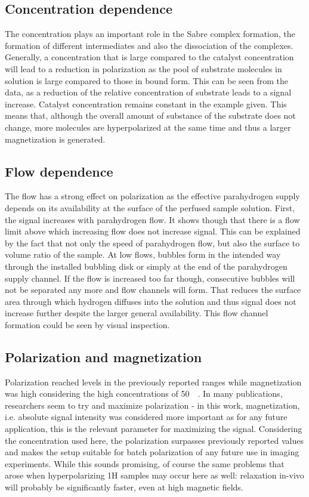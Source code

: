         \subsection{Concentration dependence}
            The concentration plays an important role in the Sabre complex formation, the formation of different intermediates and also the dissociation of the complexes. Generally, a concentration that is large compared to the catalyst concentration will lead to a reduction in polarization as the pool of substrate molecules in solution is large compared to those in bound form. This can be seen from the data, as a reduction of the relative concentration of substrate leads to a signal increase. Catalyst concentration remains constant in the example given. This means that, although the overall amount of substance of the substrate does not change, more molecules are hyperpolarized at the same time and thus a larger magnetization is generated.
        \subsection{Flow dependence}
            The flow has a strong effect on polarization as the effective parahydrogen supply depends on its availability at the surface of the perfused sample solution. First, the signal increases with parahydrogen flow. It shows though that there is a flow limit above which increasing flow does not increase signal. This can be explained by the fact that not only the speed of parahydrogen flow, but also the surface to volume ratio of the sample. At low flows, bubbles form in the intended way through the installed bubbling disk or simply at the end of the parahydrogen supply channel. If the flow is increased too far though, consecutive bubbles will not be separated any more and flow channels will form. That reduces the surface area through which hydrogen diffuses into the solution and thus signal does not increase further despite the larger general availability. This flow channel formation could be seen by visual inspection.
        \subsection{Polarization and magnetization}
            Polarization reached levels in the previously reported ranges while magnetization was high considering the high concentrations of \SI{50}{\milli\molar}. In many publications, researchers seem to try and maximize polarization - in this work, magnetization, i.e. absolute signal intensity was considered more important as for any future application, this is the relevant parameter for maximizing the signal. Considering the concentration used here, the polarization surpasses previously reported values and makes the setup suitable for batch polarization of any future use in imaging experiments. While this sounds promising, of course the same problems that arose when hyperpolarizing 1H samples may occur here as well: relaxation in-vivo will probably be significantly faster, even at high magnetic fields.
